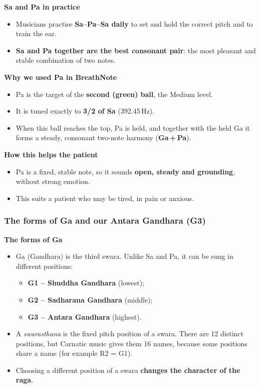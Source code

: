 \documentclass[12pt,a4paper]{article}
\begin{document}
\textbf{Sa and Pa in practice}
\begin{itemize}
  \item Musicians practise \textbf{Sa--Pa--Sa daily} to set and hold the correct pitch and to train the ear.
  \item \textbf{Sa and Pa together are the best consonant pair}: the most pleasant and stable combination of two notes.
\end{itemize}

\textbf{Why we used Pa in BreathNote}
\begin{itemize}
  \item Pa is the target of the \textbf{second (green) ball}, the Medium level.
  \item It is tuned exactly to \textbf{3/2 of Sa} (392.45\,Hz).
  \item When this ball reaches the top, Pa is held, and together with the held Ga it forms a steady, consonant two-note harmony (\textbf{Ga\,+\,Pa}).
\end{itemize}

\textbf{How this helps the patient}
\begin{itemize}
  \item Pa is a fixed, stable note, so it sounds \textbf{open, steady and grounding}, without strong emotion.
  \item This suits a patient who may be tired, in pain or anxious.
\end{itemize}

\subsubsection{The forms of Ga and our Antara Gandhara (G3)}
\textbf{The forms of Ga}
\begin{itemize}
  \item Ga (Gandhara) is the third swara. Unlike Sa and Pa, it can be sung in different positions:
  \begin{itemize}
    \item \textbf{G1 -- Shuddha Gandhara} (lowest);
    \item \textbf{G2 -- Sadharana Gandhara} (middle);
    \item \textbf{G3 -- Antara Gandhara} (highest).
  \end{itemize}
  \item A \emph{swarasthana} is the fixed pitch position of a swara. There are 12 distinct positions, but Carnatic music gives them 16 names, because some positions share a name (for example R2 = G1).
  \item Choosing a different position of a swara \textbf{changes the character of the raga}.
\end{itemize}
\end{document}
